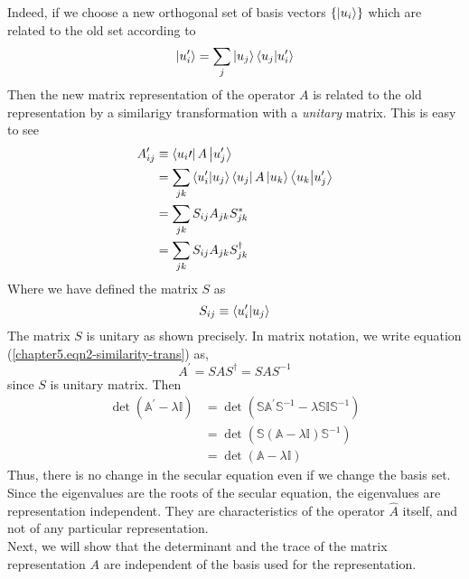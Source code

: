 	Indeed, if we choose a new orthogonal set of basis vectors $\{\ket{u_i}\}$ which are related to the old set according to 
	\begin{equation}
		\ket{u_i^\prime} = \sum_j \ket{u_j}\braket{u_j}{u_i^\prime}
	\end{equation}
	Then the new matrix representation of the operator $A$ is related to the old representation by a similarigy transformation with a \textit{unitary} matrix. This is easy to see
	\begin{eqnarray}
		A_{ij}^\prime 
		&\equiv \bra{u_i\prime} A \ket{u_j^\prime} \nonumber\\
		&= \sum_{jk} \braket{u_i^\prime}{u_j}\bra{u_j}A\ket{u_k}\braket{u_k}{u_j^\prime} \nonumber\\
		&= \sum_{jk} S_{ij} A_{jk} S_{jk}^* \nonumber\\
		&= \sum_{jk} S_{ij} A_{jk} S_{jk}^\dagger
		\label{chapter5.eqn2-similarity-trans}
	\end{eqnarray}
	Where we have defined the matrix $S$ as
	\begin{equation}
		S_{ij} \equiv \braket{u_i^\prime}{u_j}
	\end{equation}
	The matrix $S$ is unitary as shown precisely. In matrix notation, we write equation (\ref{chapter5.eqn2-similarity-trans}) as,
	\begin{equation}
		A^\prime = S A S^\dagger = S A S^{-1}
	\end{equation}
	since $S$ is unitary matrix. Then
	\begin{eqnarray}
		\det(\mathbb{A}^\prime - \lambda \mathbb{I}) 
		&= \det(\mathbb{S}\mathbb{A}^\prime \mathbb{S}^{-1} - \lambda \mathbb{S} \mathbb{I} \mathbb{S}^{-1}) \nonumber \\
		&= \det(\mathbb{S}(\mathbb{A} - \lambda \mathbb{I}) \mathbb{S}^{-1})\nonumber \\
		&= \det(\mathbb{A} - \lambda \mathbb{I})
	\end{eqnarray}
	Thus, there is no change in the secular equation even if we change the basis set. Since the eigenvalues are the roots of the secular equation, the eigenvalues are representation independent. They are characteristics of the operator $\hat{A}$ itself, and not of any particular representation.\\

	Next, we will show that the determinant and the trace of the matrix representation $A$ are independent of the basis used for the representation.\\
	
